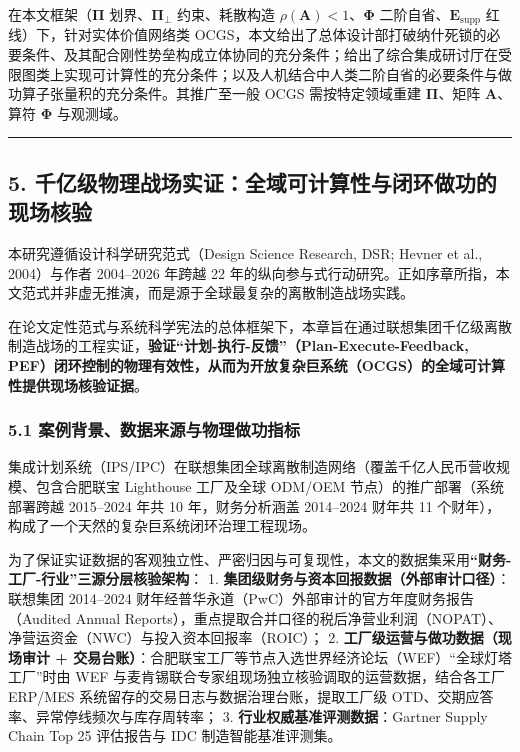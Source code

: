 \documentclass[
]{article}
\begin{document}
在本文框架（\(\mathbf{\Pi}\) 划界、\(\mathbf{\Pi}_\bot\) 约束、耗散构造
\(\rho(\mathbf{A}) < 1\)、\(\mathbf{\Phi}\)
二阶自省、\(\mathbf{E}_{\mathrm{supp}}\) 红线）下，针对实体价值网络类
OCGS，本文给出了总体设计部打破纳什死锁的必要条件、及其配合刚性势垒构成立体协同的充分条件；给出了综合集成研讨厅在受限图类上实现可计算性的充分条件；以及人机结合中人类二阶自省的必要条件与做功算子张量积的充分条件。其推广至一般
OCGS 需按特定领域重建 \(\mathbf{\Pi}\)、矩阵 \(\mathbf{A}\)、算符
\(\mathbf{\Phi}\) 与观测域。

\begin{center}\rule{0.5\linewidth}{0.5pt}\end{center}

\subsection{5.
千亿级物理战场实证：全域可计算性与闭环做功的现场核验}\label{ux5343ux4ebfux7ea7ux7269ux7406ux6218ux573aux5b9eux8bc1ux5168ux57dfux53efux8ba1ux7b97ux6027ux4e0eux95edux73afux505aux529fux7684ux73b0ux573aux6838ux9a8c}

本研究遵循设计科学研究范式（Design Science Research, DSR; Hevner et al.,
2004）与作者 2004--2026 年跨越 22
年的纵向参与式行动研究。正如序章所指，本文范式并非虚无推演，而是源于全球最复杂的离散制造战场实践。

在论文定性范式与系统科学宪法的总体框架下，本章旨在通过联想集团千亿级离散制造战场的工程实证，\textbf{验证``计划-执行-反馈''（Plan-Execute-Feedback,
PEF）闭环控制的物理有效性，从而为开放复杂巨系统（OCGS）的全域可计算性提供现场核验证据}。

\subsubsection{5.1
案例背景、数据来源与物理做功指标}\label{ux6848ux4f8bux80ccux666fux6570ux636eux6765ux6e90ux4e0eux7269ux7406ux505aux529fux6307ux6807}

集成计划系统（IPS/IPC）在联想集团全球离散制造网络（覆盖千亿人民币营收规模、包含合肥联宝
Lighthouse 工厂及全球 ODM/OEM 节点）的推广部署（系统部署跨越 2015--2024
年共 10 年，财务分析涵盖 2014--2024 财年共 11
个财年），构成了一个天然的复杂巨系统闭环治理工程现场。

为了保证实证数据的客观独立性、严密归因与可复现性，本文的数据集采用\textbf{``财务-工厂-行业''三源分层核验架构}：
1. \textbf{集团级财务与资本回报数据（外部审计口径）}：联想集团
2014--2024 财年经普华永道（PwC）外部审计的官方年度财务报告（Audited
Annual
Reports），重点提取合并口径的税后净营业利润（NOPAT）、净营运资金（NWC）与投入资本回报率（ROIC）；
2. \textbf{工厂级运营与做功数据（现场审计 +
交易台账）}：合肥联宝工厂等节点入选世界经济论坛（WEF）``全球灯塔工厂''时由
WEF 与麦肯锡联合专家组现场独立核验调取的运营数据，结合各工厂 ERP/MES
系统留存的交易日志与数据治理台账，提取工厂级
OTD、交期应答率、异常停线频次与库存周转率； 3.
\textbf{行业权威基准评测数据}：Gartner Supply Chain Top 25 评估报告与
IDC 制造智能基准评测集。
\end{document}
